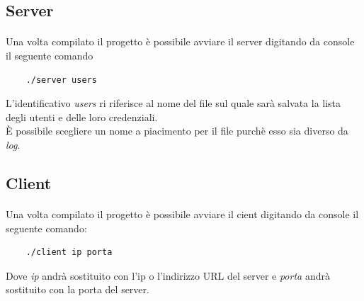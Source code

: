 \documentclass[a4paper]{article}
\begin{document}
\subsection{Server}
\paragraph{}
Una volta compilato il progetto è possibile avviare il server digitando da console il seguente comando
\begin{verbatim}
    ./server users
\end{verbatim}
L'identificativo \textit{users} ri riferisce al nome del file sul quale sarà salvata la lista degli utenti e delle loro credenziali.\\
È possibile scegliere un nome a piacimento per il file purchè esso sia diverso da \textit{log}.
\subsection{Client}
\paragraph{}
Una volta compilato il progetto è possibile avviare il cient digitando da console il seguente comando:
\begin{verbatim}
    ./client ip porta
\end{verbatim}
Dove \textit{ip} andrà sostituito con l'ip o l'indirizzo URL del server e \textit{porta} andrà sostituito con la porta del server.
\end{document}
